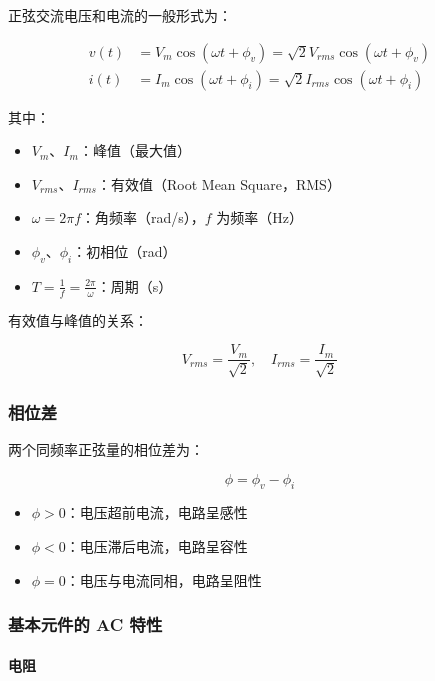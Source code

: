 正弦交流电压和电流的一般形式为：

\begin{align}
v(t) &= V_m \cos(\omega t + \phi_v) = \sqrt{2} V_{rms} \cos(\omega t + \phi_v) \label{eq:ac-voltage} \\
i(t) &= I_m \cos(\omega t + \phi_i) = \sqrt{2} I_{rms} \cos(\omega t + \phi_i) \label{eq:ac-current}
\end{align}

其中：
\begin{itemize}
  \item $V_m$、$I_m$：峰值（最大值）
  \item $V_{rms}$、$I_{rms}$：有效值（Root Mean Square，RMS）
  \item $\omega = 2\pi f$：角频率（rad/s），$f$ 为频率（Hz）
  \item $\phi_v$、$\phi_i$：初相位（rad）
  \item $T = \frac{1}{f} = \frac{2\pi}{\omega}$：周期（s）
\end{itemize}

有效值与峰值的关系：

\begin{equation}
V_{rms} = \frac{V_m}{\sqrt{2}}, \quad I_{rms} = \frac{I_m}{\sqrt{2}} \label{eq:rms-relation}
\end{equation}

\subsubsection{相位差}

两个同频率正弦量的相位差为：

\begin{equation}
\phi = \phi_v - \phi_i \label{eq:phase-difference}
\end{equation}

\begin{itemize}
  \item $\phi > 0$：电压超前电流，电路呈感性
  \item $\phi < 0$：电压滞后电流，电路呈容性
  \item $\phi = 0$：电压与电流同相，电路呈阻性
\end{itemize}

\subsubsection{基本元件的 AC 特性}

\paragraph{电阻}

